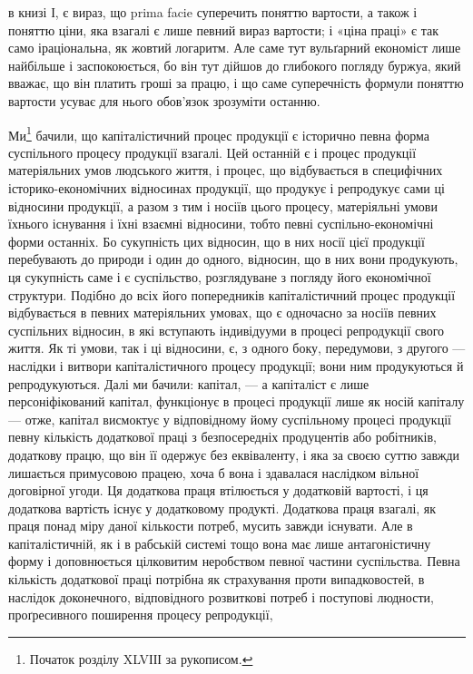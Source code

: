 в книзі І, є вираз, що prima facie суперечить поняттю вартости, а також
і поняттю ціни, яка взагалі є лише певний вираз вартости; і «ціна праці»
є так само іраціональна, як жовтий логаритм. Але саме тут вульґарний
економіст лише найбільше і заспокоюється, бо він тут дійшов до глибокого погляду
буржуа, який вважає, що він платить гроші за працю, і що саме суперечність
формули поняттю вартости усуває для нього обов’язок зрозуміти останню.

Ми\footnote{
Початок розділу XLVІІІ за рукописом.
} бачили, що капіталістичний процес продукції є історично певна
форма суспільного процесу продукції взагалі. Цей останній є і процес продукції
матеріяльних умов людського життя, і процес, що відбувається в специфічних
історико-економічних відносинах продукції, що продукує і репродукує сами
ці відносини продукції, а разом з тим і носіїв цього процесу, матеріяльні умови їхнього
існування і їхні взаємні відносини, тобто певні суспільно-економічні
форми останніх. Бо сукупність цих відносин, що в них носії цієї продукції перебувають
до природи і один до одного, відносин, що в них вони продукують, ця сукупність
саме і є суспільство, розглядуване з погляду його економічної структури.
Подібно до всіх його попередників капіталістичний процес продукції відбувається
в певних матеріяльних умовах, що є одночасно за носіїв певних суспільних
відносин, в які вступають індивідууми в процесі репродукції свого життя. Як
ті умови, так і ці відносини, є, з одного боку, передумови, з другого — наслідки
і витвори капіталістичного процесу продукції; вони ним продукуються й репродукуються.
Далі ми бачили: капітал, — а капіталіст є лише персоніфікований
капітал, функціонує в процесі продукції лише як носій капіталу — отже, капітал
висмоктує у відповідному йому суспільному процесі продукції певну кількість
додаткової праці з безпосередніх продуцентів або робітників, додаткову працю,
що він її одержує без еквіваленту, і яка за своєю суттю завжди лишається
примусовою працею, хоча б вона і здавалася наслідком вільної договірної угоди.
Ця додаткова праця втілюється у додатковій вартості, і ця додаткова вартість
існує у додатковому продукті. Додаткова праця взагалі, як праця понад міру
даної кількости потреб, мусить завжди існувати. Але в капіталістичній, як і в рабській
системі тощо вона має лише антагоністичну форму і доповнюється цілковитим
неробством певної частини суспільства. Певна кількість додаткової праці потрібна
як страхування проти випадковостей, в наслідок доконечного, відповідного розвиткові
потреб і поступові людности, проґресивного поширення процесу репродукції,
